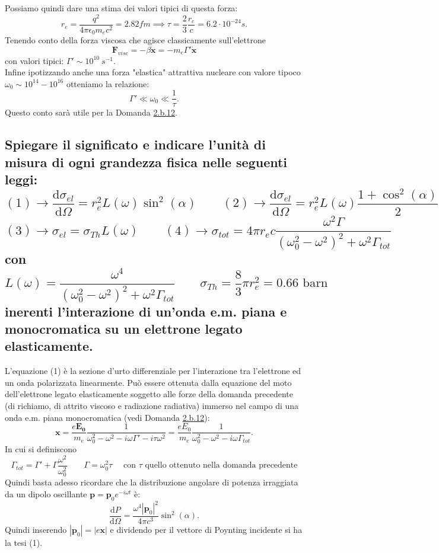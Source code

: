 Possiamo quindi dare una stima dei valori tipici di questa forza:
\[
r_e = \frac{q^2}{4\pi \epsilon_0 m_e c^2} = 2.82 fm \implies \tau = \frac{2}{3}\frac{r_e}{c} = 6.2 \cdot 10^{-24} s 
.\] \label{eq: raggio classico} 
Tenendo conto della forza viscosa che agisce classicamente sull'elettrone 
\[
	\boldsymbol{F}_{visc} = -\beta \dot{\boldsymbol{x}} = - m_e \Gamma' \dot{\boldsymbol{x}} 
\]
con valori tipici: $\Gamma' \sim 10^{10} \ s^{-1}$.\\
Infine ipotizzando anche una forza "elastica" attrattiva nucleare con valore tipoco $\omega_{0} \sim 10^{14} - 10^{16}$ otteniamo la relazione:
\[
\Gamma' \ll \omega_{0} \ll \frac{1}{\tau}
.\] 
Questo conto sarà utile per la Domanda \hyperref[subsec: 2.b.12]{2.b.12}.

\subsection[]{ Spiegare il significato e indicare l'unità di misura di ogni grandezza fisica nelle seguenti leggi:
\[
	\left( 1 \right) \to \frac{\mbox{d} \sigma_{el}}{\mbox{d} \Omega} = r_{e}^2 L \left( \omega \right)  \sin^2 \left( \alpha \right)   \quad \quad
	\left( 2 \right) \to  \frac{\mbox{d} \sigma_{el}}{\mbox{d} \Omega} = r_{e}^2 L \left( \omega \right)  \frac{1 + \cos^2 \left( \alpha \right) }{2}   
\]
\[
	\left( 3 \right) \to  \sigma_{el} = \sigma_{Th} L \left( \omega \right) \quad \quad 
	\left( 4 \right) \to  \sigma_{tot} = 4 \pi r_{e} c \frac{\omega^2 \Gamma }{\left( \omega_{0}^2 - \omega^2 \right)^2 + \omega^2 \Gamma_{tot} } 
\] 
con 
\[
	L \left( \omega \right) = \frac{\omega^4}{\left( \omega_{0}^2 - \omega^2 \right)^2 + \omega^2 \Gamma_{tot} } \quad \quad 
	\sigma_{Th} = \frac{8}{3} \pi r_{e}^2 = 0.66 \text{ barn}
\]
inerenti l'interazione di un’onda e.m. piana e monocromatica su un elettrone legato elasticamente.} \label{subsec: 2.a.16}
L'equazione (1) è la sezione d'urto differenziale per l'interazione tra l'elettrone ed un onda polarizzata linearmente. Può essere ottenuta dalla equazione del moto dell'elettrone legato elasticamente soggetto alle forze della domanda precedente (di richiamo, di attrito viscoso e radiazione radiativa) immerso nel campo di una onda e.m. piana monocromatica (vedi Domanda \hyperref[subsec: 2.b.12]{2.b.12}):
\[
	\boldsymbol{x} = \frac{e \boldsymbol{E_0}}{m_e}\frac{1}{\omega_0^2-\omega^2- i\omega \Gamma' - i \tau \omega^2} = \frac{eE_0}{m_e}\frac{1}{\omega_0^2-\omega^2- i\omega\Gamma_{tot}}
.\] 
In cui si definiscono 
\[
	\Gamma_{tot} = \Gamma' + \Gamma \frac{\omega^2}{\omega_0^2} \quad \quad 
	\Gamma = \omega_0^2 \tau \quad \text{ con $\tau$ quello ottenuto nella domanda precedente}
\]
Quindi basta adesso ricordare che la distribuzione angolare di potenza irraggiata da un dipolo oscillante $ \boldsymbol{p} = \boldsymbol{p}_0 e^{-i\omega t}$ è:
\[
	\frac{\mbox{d} P}{\mbox{d} \Omega} = \frac{\omega^{4} \left| \boldsymbol{p}_0 \right|^2 }{4\pi c^3} \sin^2\left( \alpha \right) 
.\] 
Quindi inserendo $\left| \boldsymbol{p}_0 \right| = \left| e \boldsymbol{x} \right| $  e dividendo per il vettore di Poynting incidente si ha la tesi (1).

